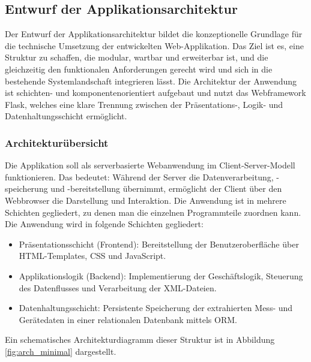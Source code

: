 \subsection{Entwurf der Applikationsarchitektur}
\label{subsec:entwurf-der-applikationsarchitektur}


Der Entwurf der Applikationsarchitektur bildet die konzeptionelle Grundlage für die technische Umsetzung der entwickelten Web-Applikation.
Das Ziel ist es, eine Struktur zu schaffen, die modular, wartbar und erweiterbar ist, und die gleichzeitig den funktionalen Anforderungen gerecht wird und sich in die bestehende Systemlandschaft integrieren lässt.
Die Architektur der Anwendung ist schichten- und komponentenorientiert aufgebaut und nutzt das Webframework Flask, welches eine klare Trennung zwischen der Präsentations-, Logik- und Datenhaltungsschicht ermöglicht.


\subsubsection{Architekturübersicht}

Die Applikation soll als serverbasierte Webanwendung im Client-Server-Modell funktionieren.
Das bedeutet: Während der Server die Datenverarbeitung, -speicherung und -bereitstellung übernimmt, ermöglicht der Client über den Webbrowser die Darstellung und Interaktion.
Die Anwendung ist in mehrere Schichten gegliedert, zu denen man die einzelnen Programmteile zuordnen kann.
Die Anwendung wird in folgende Schichten gegliedert:

\begin{itemize}
\item Präsentationsschicht (Frontend): Bereitstellung der Benutzeroberfläche über HTML-Templates, CSS und JavaScript.

\item
Applikationslogik (Backend): Implementierung der Geschäftslogik, Steuerung des Datenflusses und Verarbeitung der XML-Dateien.

\item
Datenhaltungsschicht: Persistente Speicherung der extrahierten Mess- und Gerätedaten in einer relationalen Datenbank mittels ORM.

\end{itemize}

Ein schematisches Architekturdiagramm dieser Struktur ist in Abbildung \ref{fig:arch_minimal} dargestellt.

